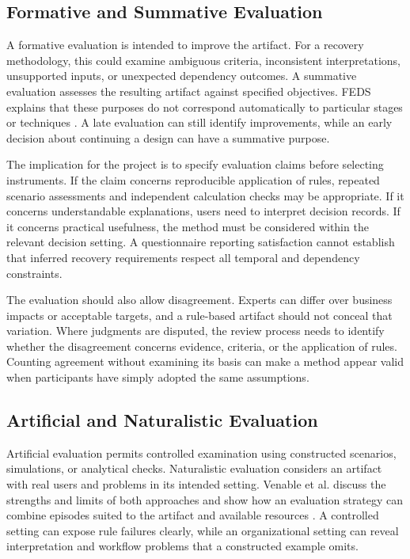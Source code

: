 \subsection{Formative and Summative Evaluation}

A formative evaluation is intended to improve the artifact. For a recovery methodology, this could examine ambiguous criteria, inconsistent interpretations, unsupported inputs, or unexpected dependency outcomes. A summative evaluation assesses the resulting artifact against specified objectives. FEDS explains that these purposes do not correspond automatically to particular stages or techniques \cite{venable2016feds}. A late evaluation can still identify improvements, while an early decision about continuing a design can have a summative purpose.

The implication for the project is to specify evaluation claims before selecting instruments. If the claim concerns reproducible application of rules, repeated scenario assessments and independent calculation checks may be appropriate. If it concerns understandable explanations, users need to interpret decision records. If it concerns practical usefulness, the method must be considered within the relevant decision setting. A questionnaire reporting satisfaction cannot establish that inferred recovery requirements respect all temporal and dependency constraints.

The evaluation should also allow disagreement. Experts can differ over business impacts or acceptable targets, and a rule-based artifact should not conceal that variation. Where judgments are disputed, the review process needs to identify whether the disagreement concerns evidence, criteria, or the application of rules. Counting agreement without examining its basis can make a method appear valid when participants have simply adopted the same assumptions.

\subsection{Artificial and Naturalistic Evaluation}

Artificial evaluation permits controlled examination using constructed scenarios, simulations, or analytical checks. Naturalistic evaluation considers an artifact with real users and problems in its intended setting. Venable et al. discuss the strengths and limits of both approaches and show how an evaluation strategy can combine episodes suited to the artifact and available resources \cite{venable2016feds}. A controlled setting can expose rule failures clearly, while an organizational setting can reveal interpretation and workflow problems that a constructed example omits.

